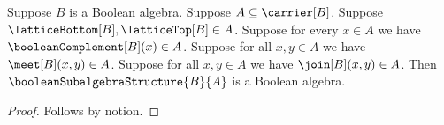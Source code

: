 

\begin{proposition}\label{notion_prefix_predicate_components}
    Suppose $B$ is a Boolean algebra.
    Suppose $A\subseteq\carrier[B]$.
    Suppose $\latticeBottom[B],\latticeTop[B]\in A$.
    Suppose for every $x\in A$ we have
        $\booleanComplement[B](x)\in A$.
    Suppose for all $x,y\in A$ we have $\meet[B](x,y)\in A$.
    Suppose for all $x,y\in A$ we have $\join[B](x,y)\in A$.
    Then $\booleanSubalgebraStructure{B}{A}$ is a Boolean algebra.
\end{proposition}
\begin{proof}
    Follows by notion.
\end{proof}

